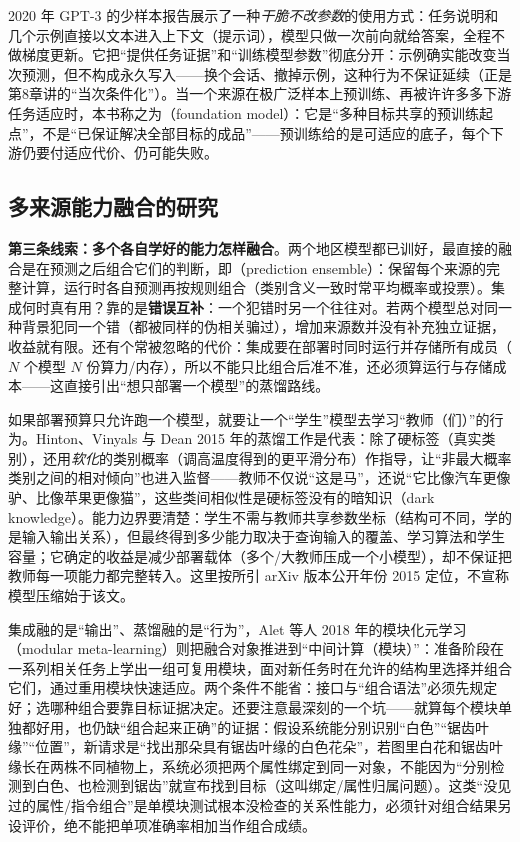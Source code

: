 2020 年 GPT-3 的少样本报告展示了一种\emph{干脆不改参数}的使用方式：任务说明和几个示例直接以文本进入上下文（提示词），模型只做一次前向就给答案，全程不做梯度更新。它把“提供任务证据”和“训练模型参数”彻底分开：示例确实能改变当次预测，但不构成永久写入——换个会话、撤掉示例，这种行为不保证延续（正是第8章讲的“当次条件化”）。当一个来源在极广泛样本上预训练、再被许许多多下游任务适应时，本书称之为（foundation model）：它是“多种目标共享的预训练起点”，不是“已保证解决全部目标的成品”——预训练给的是可适应的底子，每个下游仍要付适应代价、仍可能失败。

\subsection{多来源能力融合的研究}
\label{sec:kts-overview-history-integration}

\textbf{第三条线索：多个各自学好的能力怎样融合}。两个地区模型都已训好，最直接的融合是在预测之后组合它们的判断，即（prediction ensemble）：保留每个来源的完整计算，运行时各自预测再按规则组合（类别含义一致时常平均概率或投票）。集成何时真有用？靠的是\textbf{错误互补}：一个犯错时另一个往往对。若两个模型总对同一种背景犯同一个错（都被同样的伪相关骗过），增加来源数并没有补充独立证据，收益就有限。还有个常被忽略的代价：集成要在部署时同时运行并存储所有成员（$N$ 个模型 $N$ 份算力/内存），所以不能只比组合后准不准，还必须算运行与存储成本——这直接引出“想只部署一个模型”的蒸馏路线。

如果部署预算只允许跑一个模型，就要让一个“学生”模型去学习“教师（们）”的行为。Hinton、Vinyals 与 Dean 2015 年的蒸馏工作是代表：除了硬标签（真实类别），还用\emph{软化}的类别概率（调高温度得到的更平滑分布）作指导，让“非最大概率类别之间的相对倾向”也进入监督——教师不仅说“这是马”，还说“它比像汽车更像驴、比像苹果更像猫”，这些类间相似性是硬标签没有的暗知识（dark knowledge）。能力边界要清楚：学生不需与教师共享参数坐标（结构可不同，学的是输入输出关系），但最终得到多少能力取决于查询输入的覆盖、学习算法和学生容量；它确定的收益是减少部署载体（多个/大教师压成一个小模型），却不保证把教师每一项能力都完整转入。这里按所引 arXiv 版本公开年份 2015 定位，不宣称模型压缩始于该文。

集成融的是“输出”、蒸馏融的是“行为”，Alet 等人 2018 年的模块化元学习（modular meta-learning）则把融合对象推进到“中间计算（模块）”：准备阶段在一系列相关任务上学出一组可复用模块，面对新任务时在允许的结构里选择并组合它们，通过重用模块快速适应。两个条件不能省：接口与“组合语法”必须先规定好；选哪种组合要靠目标证据决定。还要注意最深刻的一个坑——就算每个模块单独都好用，也仍缺“组合起来正确”的证据：假设系统能分别识别“白色”“锯齿叶缘”“位置”，新请求是“找出那朵具有锯齿叶缘的白色花朵”，若图里白花和锯齿叶缘长在两株不同植物上，系统必须把两个属性绑定到同一对象，不能因为“分别检测到白色、也检测到锯齿”就宣布找到目标（这叫绑定/属性归属问题）。这类“没见过的属性/指令组合”是单模块测试根本没检查的关系性能力，必须针对组合结果另设评价，绝不能把单项准确率相加当作组合成绩。

